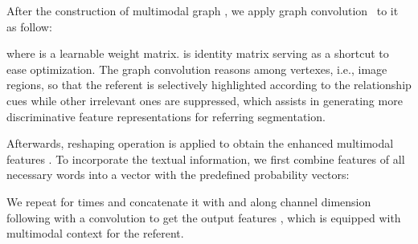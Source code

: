 \documentclass[10pt,twocolumn,letterpaper]{article}
\begin{document}
After the construction of multimodal graph , we apply graph convolution~\cite{kipf2016semi} to it as follow:

where  is a learnable weight matrix.
 is identity matrix serving as a shortcut to ease optimization.
The graph convolution reasons among vertexes, i.e., image regions, so that the referent is selectively highlighted according to the relationship cues while other irrelevant ones are suppressed, which assists in generating more discriminative feature representations for referring segmentation.

Afterwards, reshaping operation is applied to obtain the enhanced multimodal 
features .
To incorporate the textual information, we first combine features of all necessary 
words into a vector  with the predefined probability vectors:

We repeat  for  
times and concatenate it with  and  along channel dimension following with a  convolution to get the output features , which is equipped with multimodal context for the referent.
\end{document}
